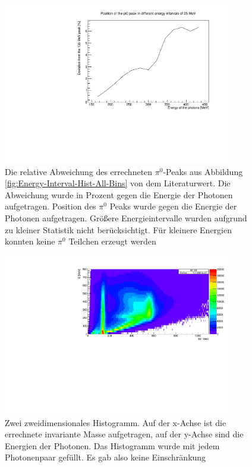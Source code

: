 \documentclass[a4paper,11pt,oneside,final,german,openbib,pdftex]{scrbook}
\begin{document}
\begin{appendix}
\begin{figure}[h!]
	\begin{center}
		\includegraphics[width=100mm]{relativedependency0903}
		
		\caption{Die relative Abweichung des errechneten $\pi^0$-Peaks aus Abbildung \ref{fig:Energy-Interval-Hist-All-Bins} von dem Literaturwert. Die Abweichung wurde in Prozent gegen die Energie der Photonen aufgetragen.  Position des $\pi^0$ Peaks wurde gegen die Energie der Photonen aufgetragen. Gr\"o{\ss}ere Energieintervalle wurden aufgrund zu kleiner Statistik nicht ber\"ucksichtigt. F\"ur kleinere Energien konnten keine $\pi^0$ Teilchen erzeugt werden}			
		\label{fig:RelativEnergyDependency}	

	\end{center}
\end{figure}

\begin{figure}[h!]
	\begin{center}
		\includegraphics[width=100mm]{allphotons2Dhist1303}
		\caption{Zwei zweidimensionales Histogramm. Auf der x-Achse ist die errechnete invariante Masse aufgetragen, auf der y-Achse sind die Energien der Photonen. Das Histogramm wurde mit jedem Photonenpaar gefüllt. Es gab also keine Einschränkung }
		\label{fig:Energy-Intervall-Hist-All-Energys-No-Condition}
	\end{center}
\end{figure}



\end{appendix}
\end{document}
